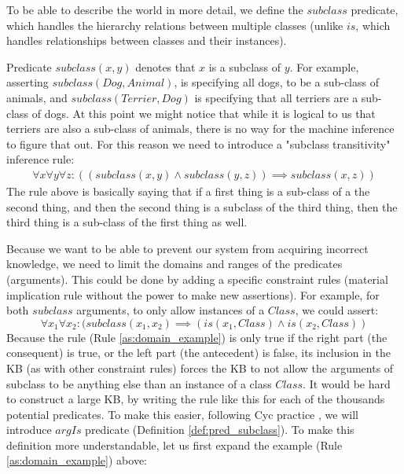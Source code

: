 To be able to describe the world in more detail, we define the $subclass$ 
predicate, which handles the hierarchy relations between multiple classes 
(unlike $is$, which handles relationships between classes and their instances).

\begin{definition}\label{def:pred_subclass}
Predicate $subclass(x,y)$ denotes that $x$ is a subclass of $y$. For example, 
asserting $subclass(Dog, Animal)$, is specifying all dogs, to be a sub-class of
animals, and $subclass(Terrier,Dog)$ is specifying that all terriers are 
a sub-class of dogs. At this point we might notice that while it is logical to us
that terriers are also a sub-class of animals, there is no way for the machine
inference to figure that out. For this reason we need to introduce a
"subclass transitivity" inference rule:
\begin{equation}\label{rule:subclass_transitivity}
\begin{gathered}
  \forall x \forall y \forall z: ((subclass(x,y) \land subclass(y,z)) \implies subclass(x,z))
\end{gathered}
\end{equation}
The rule above is basically saying that if a first thing is a sub-class of a
the second thing, and then the second thing is a subclass of the third thing,
then the third thing is a sub-class of the first thing as well. 
\end{definition}

Because we want to be able to prevent our system from acquiring incorrect 
knowledge, we need to limit the domains and ranges of the predicates 
(arguments). This could be done by adding a specific constraint rules
(material implication rule without the power to make new assertions). For 
example, for both $subclass$ arguments, to only allow instances of a $Class$, 
we could assert:
\begin{equation}\label{as:domain_example}
  \forall x_1 \forall x_2: (subclass(x_1,x_2) \implies (is(x_1,Class) \land 
  is(x_2,Class))
\end{equation}
Because the rule (Rule \ref{as:domain_example}) is only true if the right part
(the consequent) is true, or the left part (the antecedent) is false, its
inclusion in the KB (as with other constraint rules) forces the KB to not allow
the arguments of subclass to be anything else than an instance of a class 
$Class$. It would be hard to construct a large KB, by writing the rule
like this for each of the thousands potential predicates. To make this easier,
following Cyc practice \parencite{Lenat1995}, we will introduce $argIs$ 
predicate (Definition \ref{def:pred_subclass}). To make this definition 
more understandable, let us
first expand the example (Rule \ref{as:domain_example}) above:

